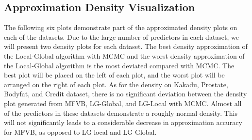 \subsection{Approximation Density Visualization}
The following six plots demonstrate part of the approximated density plots on each of the datasets. Due to the large number of predictors in each dataset, we will present two density plots for each dataset. The best density approximation of the Local-Global algorithm with MCMC and the worst density approximation of the Local-Global algorithm is the most deviated compared with MCMC. The best plot will be placed on the left of each plot, and the worst plot will be arranged on the right of each plot.
As for the density on Kakadu, Prostate, Bodyfat, and Credit dataset, there is no significant deviation between the density plot generated from MFVB, LG-Global, and LG-Local with MCMC. Almost all of the predictors in these datasets demonstrate a roughly normal density. This will not significantly leads to a considerable decrease in approximation accuracy for MFVB, as opposed to LG-local and LG-Global.\\

